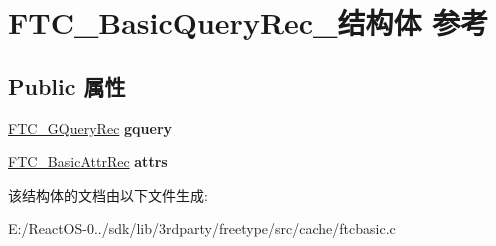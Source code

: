 \hypertarget{struct_f_t_c___basic_query_rec__}{}\section{F\+T\+C\+\_\+\+Basic\+Query\+Rec\+\_\+结构体 参考}
\label{struct_f_t_c___basic_query_rec__}
\subsection*{Public 属性}
\begin{DoxyCompactItemize}
\item 
\mbox{\label{struct_f_t_c___basic_query_rec___a6f68bd16488f4f6ed11d07ee023a5999}} 
\hyperlink{struct_f_t_c___g_query_rec__}{F\+T\+C\+\_\+\+G\+Query\+Rec} {\bfseries gquery}
\item 
\mbox{\label{struct_f_t_c___basic_query_rec___a03aaf982820ab824530bcf27894ce43b}} 
\hyperlink{struct_f_t_c___basic_attr_rec__}{F\+T\+C\+\_\+\+Basic\+Attr\+Rec} {\bfseries attrs}
\end{DoxyCompactItemize}


该结构体的文档由以下文件生成\+:\begin{DoxyCompactItemize}
\item 
E\+:/\+React\+O\+S-\/0../sdk/lib/3rdparty/freetype/src/cache/ftcbasic.\+c\end{DoxyCompactItemize}
